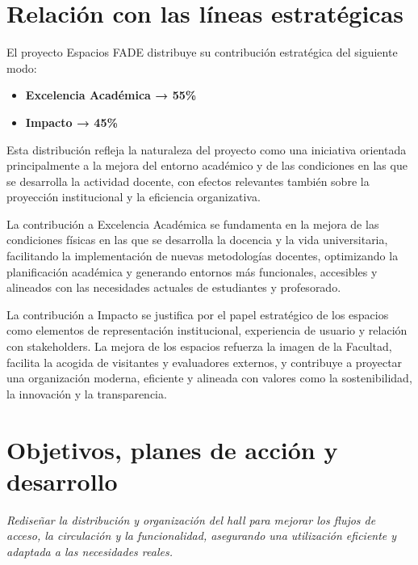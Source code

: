 \documentclass[11pt,a4paper]{scrreprt}
\begin{document}
\section{Relación con las líneas estratégicas}

\small
El proyecto Espacios FADE distribuye su contribución estratégica del siguiente modo:

\begin{itemize}[noitemsep,topsep=2pt]
\item \textbf{Excelencia Académica → 55\%}
\item \textbf{Impacto → 45\%}
\end{itemize}

Esta distribución refleja la naturaleza del proyecto como una iniciativa orientada principalmente a la mejora del entorno académico y de las condiciones en las que se desarrolla la actividad docente, con efectos relevantes también sobre la proyección institucional y la eficiencia organizativa.

La contribución a Excelencia Académica se fundamenta en la mejora de las condiciones físicas en las que se desarrolla la docencia y la vida universitaria, facilitando la implementación de nuevas metodologías docentes, optimizando la planificación académica y generando entornos más funcionales, accesibles y alineados con las necesidades actuales de estudiantes y profesorado.

La contribución a Impacto se justifica por el papel estratégico de los espacios como elementos de representación institucional, experiencia de usuario y relación con stakeholders. La mejora de los espacios refuerza la imagen de la Facultad, facilita la acogida de visitantes y evaluadores externos, y contribuye a proyectar una organización moderna, eficiente y alineada con valores como la sostenibilidad, la innovación y la transparencia.
\section{Objetivos, planes de acción y desarrollo}
\newpage
{}
{\small\color{mutedcolor}\itshape Rediseñar la distribución y organización del hall para mejorar los flujos de acceso, la circulación y la funcionalidad, asegurando una utilización eficiente y adaptada a las necesidades reales.}\par\vspace{6pt}
\end{document}
